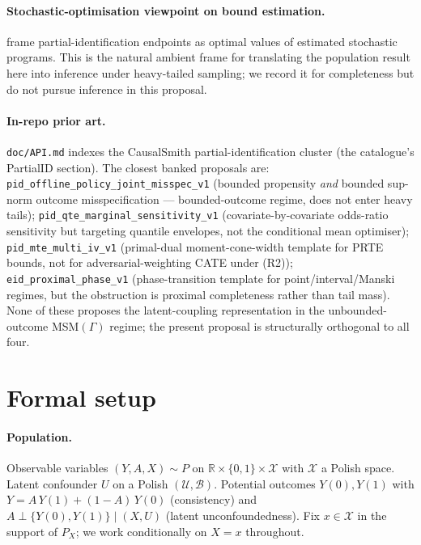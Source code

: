 \documentclass[11pt]{article}
\newcommand{\R}{\mathbb{R}}
\theoremstyle{definition}
\theoremstyle{plain}
\theoremstyle{remark}
\begin{document}
\paragraph{Stochastic-optimisation viewpoint on bound estimation.} \citet{TudballBowdenHughesTilling2023SampleConstrained} frame partial-identification endpoints as optimal values of estimated stochastic programs. This is the natural ambient frame for translating the population result here into inference under heavy-tailed sampling; we record it for completeness but do not pursue inference in this proposal.

\paragraph{In-repo prior art.} \texttt{doc/API.md} indexes the CausalSmith partial-identification cluster (the catalogue's PartialID section). The closest banked proposals are: \texttt{pid\_offline\_policy\_joint\_misspec\_v1} (bounded propensity \emph{and} bounded sup-norm outcome misspecification --- bounded-outcome regime, does not enter heavy tails); \texttt{pid\_qte\_marginal\_sensitivity\_v1} (covariate-by-covariate odds-ratio sensitivity but targeting quantile envelopes, not the conditional mean optimiser); \texttt{pid\_mte\_multi\_iv\_v1} (primal-dual moment-cone-width template for PRTE bounds, not for adversarial-weighting CATE under (R2)); \texttt{eid_proximal_phase\_v1} (phase-transition template for point/interval/Manski regimes, but the obstruction is proximal completeness rather than tail mass). None of these proposes the latent-coupling representation in the unbounded-outcome MSM$(\Gamma)$ regime; the present proposal is structurally orthogonal to all four.

\section{Formal setup}

\paragraph{Population.} Observable variables $(Y, A, X) \sim P$ on $\R \times \{0,1\} \times \mathcal{X}$ with $\mathcal{X}$ a Polish space. Latent confounder $U$ on a Polish $(\mathcal{U}, \mathcal{B})$. Potential outcomes $Y(0), Y(1)$ with $Y = A\,Y(1) + (1-A)\,Y(0)$ (consistency) and $A \perp \{Y(0), Y(1)\} \mid (X, U)$ (latent unconfoundedness). Fix $x \in \mathcal{X}$ in the support of $P_X$; we work conditionally on $X = x$ throughout.
\end{document}
